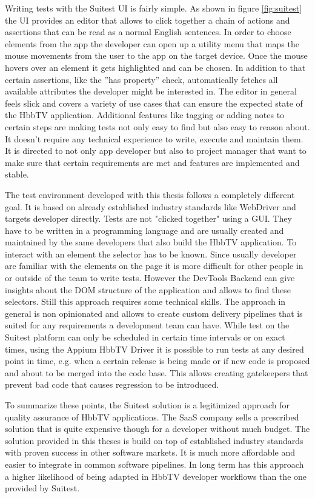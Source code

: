 Writing tests with the Suitest UI is fairly simple. As shown in figure \ref{fig:suitest} the UI provides an editor
that allows to click together a chain of actions and assertions that can be read as a normal English sentences. In
order to choose elements from the app the developer can open up a utility menu that maps the mouse movements from the
user to the app on the target device. Once the mouse hovers over an element it gets highlighted and can be chosen.
In addition to that certain assertions, like the ''has property'' check, automatically fetches all available attributes
the developer might be interested in. The editor in general feels slick and covers a variety of use cases that can
ensure the expected state of the HbbTV application. Additional features like tagging or adding notes to certain steps
are making tests not only easy to find but also easy to reason about. It doesn't require any technical experience
to write, execute and maintain them. It is directed to not only app developer but also to project manager that want
to make sure that certain requirements are met and features are implemented and stable.

The test environment developed with this thesis follows a completely different goal. It is based on already established
industry standards like WebDriver and targets developer directly. Tests are not "clicked together" using a GUI. They have
to be written in a programming language and are usually created and maintained by the same developers that also build
the HbbTV application. To interact with an element the selector has to be known. Since usually developer are familiar
with the elements on the page it is more difficult for other people in or outside of the team to write tests. However
the DevTools Backend can give insights about the DOM structure of the application and allows to find these selectors.
Still this approach requires some technical skills. The approach in general is non opinionated and allows to create
custom delivery pipelines that is suited for any requirements a development team can have. While test on the Suitest
platform can only be scheduled in certain time intervals or on exact times, using the Appium HbbTV Driver it is
possible to run tests at any desired point in time, e.g. when a certain release is being made or if new code is
proposed and about to be merged into the code base. This allows creating gatekeepers that prevent bad code that
causes regression to be introduced.

To summarize these points, the Suitest solution is a legitimized approach for quality assurance of HbbTV applications.
The SaaS company sells a prescribed solution that is quite expensive though for a developer without much budget. The
solution provided in this theses is build on top of established industry standards with proven success in other
software markets. It is much more affordable and easier to integrate in common software pipelines. In long term has this
approach a higher likelihood of being adapted in HbbTV developer workflows than the one provided by Suitest.
